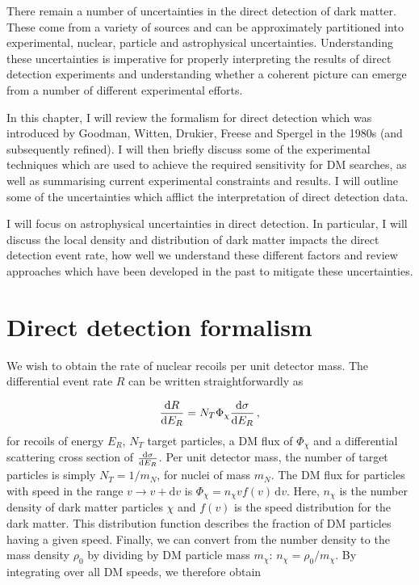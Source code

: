 There remain a number of uncertainties in the direct detection of dark matter. These come from a variety of sources and can be approximately partitioned into experimental, nuclear, particle and astrophysical uncertainties. Understanding these uncertainties is imperative for properly interpreting the results of direct detection experiments and understanding whether a coherent picture can emerge from a number of different experimental efforts.

In this chapter, I will review the formalism for direct detection which was introduced by Goodman, Witten, Drukier, Freese and Spergel in the 1980s (and subsequently refined). I will then briefly discuss some of the experimental techniques which are used to achieve the required sensitivity for DM searches, as well as summarising current experimental constraints and results. I will outline some of the uncertainties which afflict the interpretation of direct detection data.

I will focus on astrophysical uncertainties in direct detection. In particular, I will discuss the local density and distribution of dark matter impacts the direct detection event rate, how well we understand these different factors and review approaches which have been developed in the past to mitigate these uncertainties.

\section{Direct detection formalism}





We wish to obtain the rate of nuclear recoils per unit detector mass. The differential event rate $R$ can be written straightforwardly as

\begin{equation}
\frac{\mathrm{d}R}{\mathrm{d}E_R} = N_T \Phi_\chi \frac{\mathrm{d}\sigma}{\mathrm{d}E_R}\,,
\end{equation}
for recoils of energy $E_R$, $N_T$ target particles, a DM flux of $\Phi_\chi$ and a differential scattering cross section of $\frac{\mathrm{d}\sigma}{\mathrm{d}E_R}$. Per unit detector mass, the number of target particles is simply $N_T = 1/m_N$, for nuclei of mass $m_N$. The DM flux for particles with speed in the range $v \rightarrow v + \mathrm{d}v$ is $\Phi_\chi = n_\chi v f(v) \,\mathrm{d}v$. Here, $n_\chi$ is the number density of dark matter particles $\chi$ and $f(v)$ is the speed distribution for the dark matter. This distribution function describes the fraction of DM particles having a given speed. Finally, we can convert from the number density to the mass density $\rho_0$ by dividing by DM particle mass $m_\chi$: $n_\chi = \rho_0/m_\chi$. By integrating over all DM speeds, we therefore obtain

